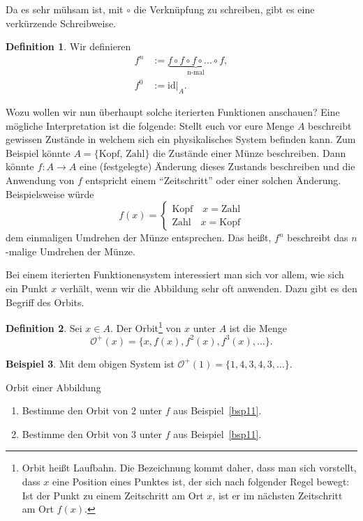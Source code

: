 \documentclass[a4paper,ngerman,12pt]{zirkelblatt1415}
\theoremstyle{definition}
\newtheorem{definition}{Definition}
\newtheorem{beispiel}[definition]{Beispiel}
\theoremstyle{remark}
\newcommand{\lra}{\longrightarrow}
\newcommand{\id}{\text{id}}
\begin{document}
Da es sehr mühsam ist, mit $\circ$ die Verknüpfung zu schreiben, gibt es eine verkürzende Schreibweise.

\begin{definition}
Wir definieren
\begin{align*}
f^n &:= \underbrace{f \circ f \circ f \circ \ldots \circ f}_{\text{n-mal}}, \\
f^0 &:= \id|_A.
\end{align*} 
\end{definition}

Wozu wollen wir nun überhaupt solche iterierten Funktionen anschauen? Eine mögliche Interpretation ist die folgende: Stellt euch vor eure Menge $A$ beschreibt gewissen Zustände in welchem sich ein physikalisches System befinden kann. Zum Beispiel könnte $A=\{\text{Kopf, Zahl}\}$ die Zustände einer Münze beschreiben. Dann könnte $f:A\lra A$ eine (festgelegte) Änderung dieses Zustands beschreiben und die Anwendung von $f$ entspricht einem "`Zeitschritt"' oder einer solchen Änderung. Beispielsweise würde
\begin{equation*}
  f(x)=\begin{cases} \text{Kopf} \quad x=\text{Zahl}\\ \text{Zahl} \quad x=\text{Kopf}\end{cases}
\end{equation*}
dem einmaligen Umdrehen der Münze entsprechen. Das heißt, $f^n$ beschreibt das $n$-malige Umdrehen der Münze.

Bei einem iterierten Funktionensystem interessiert man sich vor allem, wie sich ein Punkt $x$ verhält, wenn wir die Abbildung sehr oft anwenden. Dazu gibt es den Begriff des Orbits.

\begin{definition}
Sei $x\in A$. Der Orbit\footnote{Orbit heißt Laufbahn. Die Bezeichnung kommt daher, dass man sich vorstellt, dass $x$ eine Position eines Punktes ist, der sich nach folgender Regel bewegt: Ist der Punkt zu einem Zeitschritt am Ort $x$, ist er im nächsten Zeitschritt am Ort $f(x)$.} von $x$ unter $A$ ist die Menge
\[
\mathcal{O}^+(x) = \{x, f(x), f^2(x), f^3(x) ,\ldots\}.
\]
\end{definition}

\begin{beispiel}
Mit dem obigen System ist $\mathcal{O}^+(1) = \{1,4,3,4,3,\ldots\}$.
\end{beispiel}

\begin{aufgabe}{Orbit einer Abbildung}
  \begin{enumerate}
    \item Bestimme den Orbit von $2$ unter $f$ aus Beispiel~\ref{bsp11}.
    \item Bestimme den Orbit von $3$ unter $f$ aus Beispiel~\ref{bsp11}.
  \end{enumerate}
\end{aufgabe}
\end{document}
